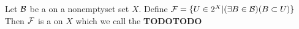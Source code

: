 \begin{prop}
    \label{prop:FilterBaseGeneratesFilter}
    Let $\mathcal{B}$ be a \FilterBase on a 
    nonemptyset set $X$. 
    Define 
    $\mathcal{F}=\{U \in 2^{X} | (\exists B \in \mathcal{B})(B \subset U) \}$
    Then $\mathcal{F}$ is a \Filter on $X$
    which we call the 
    \textbf{TODOTODO}
    
\end{prop}

